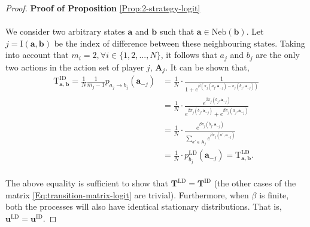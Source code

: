 \documentclass[11pt]{article}
\theoremstyle{plainCl1}
\theoremstyle{plainCl2}
\newcommand{\A}{\mathbf{A}}
\newcommand{\abf}{\mathbf{a}}
\newcommand{\bbf}{\mathbf{b}}
\newcommand{\T}{\mathbf{T}}
\newcommand{\ubf}{\mathbf{u}}
\newcommand{\LD}{\mathrm{LD}}
\newcommand{\ID}{\mathrm{ID}}
\begin{document}
\begin{proof}
\textbf{Proof of Proposition} \ref{Prop:2-strategy-logit} \\ \\
We consider two arbitrary states $\abf$ and $\bbf$ such that $\abf \in \mathrm{Neb}(\bbf)$. Let $j = \mathrm{I}(\abf,\bbf)$ be the index of difference between these neighbouring states.  Taking into account that $m_i = 2, \forall i \in \{1,2,...,N\}$, it follows that $a_j$ and $b_j$ are the only two actions in the action set of player $j$, $\A_j$. It can be shown that, 
\begin{align}
\mathrm{T}^\ID_{\abf,\bbf} = \frac{1}{N} \frac{1}{m_j - 1} p_{a_j \to b_j} (\abf_{-j}) &= \frac{1}{N} \cdot \frac{1}{1 + \displaystyle e^{\beta (\pi_j(a_j, \abf_{-j}) - \pi_j(b_j,\abf_{-j}))}} \\[10pt]
&=\frac{1}{N} \cdot \frac{ \displaystyle e^{\beta \pi_j(b_j, \abf_{-j})}}{\displaystyle e^{\beta \pi_j(b_j, \abf_{-j})} + \displaystyle e^{\beta \pi_j(a_j, \abf_{-j})}}  \\[10pt]
&= \frac{1}{N} \cdot \frac{\displaystyle e^{\beta \pi_j(b_j, \abf_{-j})}}{\displaystyle \sum_{a' \in \A_j} e^{\beta \pi_j(a',\abf_{-j})}} \\[10pt]
&= \frac{1}{N} \cdot p^{\LD}_{b_j} (\abf_{-j}) = \mathrm{T}^\LD_{\abf,\bbf}.
\end{align} \\ 
\noindent The above equality is sufficient to show that $\T^\LD = \T^\ID$ (the other cases of the matrix \ref{Eq:transition-matrix-logit} are trivial). Furthermore, when $\beta$ is finite, both the processes will also have identical stationary distributions. That is, $\ubf^\LD = \ubf^\ID$.
\end{proof}
\end{document}
